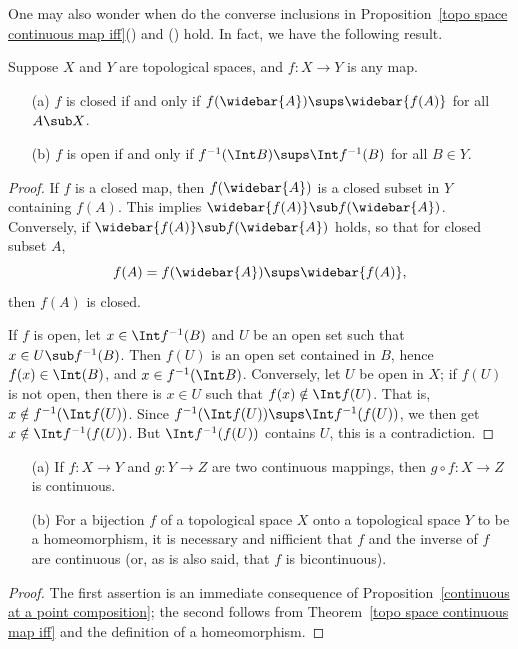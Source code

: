 One may also wonder when do the converse inclusions in Proposition~\ref{topo space continuous map iff}() and () hold. In fact, we have the following result. 
\begin{proposition}
Suppose $X$ and $Y$ are topological spaces, and $f:X\to Y$ is any map.
\begin{enumerate}
\item[(a)] $f$ is closed if and only if $f(\widebar{A})\sups\widebar{f(A)}$ for all $A\sub X$.
\item[(b)] $f$ is open if and only if $f^{-1}(\Int B)\sups \Int f^{-1}(B)$ for all $B\in Y$.
\end{enumerate}
\end{proposition}
\begin{proof}
If $f$ is a closed map, then $f(\widebar{A})$ is a closed subset in $Y$ containing $f(A)$. This implies $\widebar{f(A)}\sub f(\widebar{A})$. Conversely, if $\widebar{f(A)}\sub f(\widebar{A})$ holds, so that for closed subset $A$,
\[f(A)=f(\widebar{A})\sups \widebar{f(A)},\]
then $f(A)$ is closed.\par
If $f$ is open, let $x\in\Int f^{-1}(B)$ and $U$ be an open set such that $x\in U\sub f^{-1}(B)$. Then $f(U)$ is an open set contained in $B$, hence $f(x)\in\Int(B)$, and $x\in f^{-1}(\Int B)$. Conversely, let $U$ be open in $X$; if $f(U)$ is not open, then there is $x\in U$ such that $f(x)\notin\Int f(U)$. That is, $x\notin f^{-1}(\Int f(U))$. Since $f^{-1}(\Int f(U))\sups\Int f^{-1}(f(U))$, we then get $x\notin\Int f^{-1}(f(U))$. But $\Int f^{-1}(f(U))$ contains $U$, this is a contradiction.
\end{proof}
\begin{proposition}
\mbox{}
\begin{itemize}
\item[(a)] If $f:X\to Y$ and $g:Y\to Z$ are two continuous mappings, then $g\circ f:X\to Z$ is continuous.
\item[(b)] For a bijection $f$ of a topological space $X$ onto a topological space $Y$ to be a homeomorphism, it is necessary and nifficient that $f$ and the inverse of $f$ are continuous (or, as is also said, that $f$ is bicontinuous).
\end{itemize}
\end{proposition}
\begin{proof}
The first assertion is an immediate consequence of Proposition~\ref{continuous at a point composition}; the second follows from Theorem~\ref{topo space continuous map iff} and the definition of a homeomorphism.
\end{proof}
